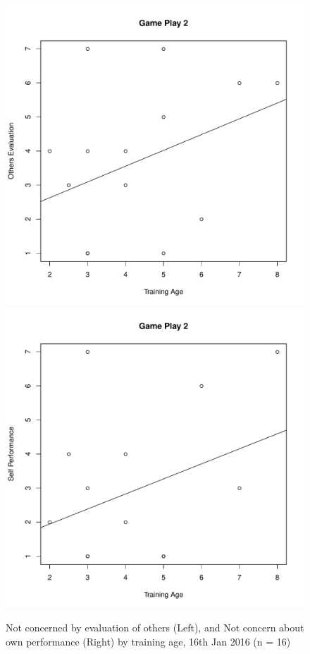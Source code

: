 \begin{CJK}{UTF8}{gbsn}
\begin{figure}[htbp]
  \centering
\includegraphics[scale=.3]{images/othersEval0116TrainingAge.pdf}
\includegraphics[scale=.3]{images/indPerf0116TrainingAge.pdf}
  \caption{Not concerned by evaluation of others (Left), and Not concern about own performance (Right) by training age,  16th Jan 2016 (n = 16)}
  \label{fig:othersEvalIndPerf0116TrainingAge}
\end{figure}



\end{CJK}
